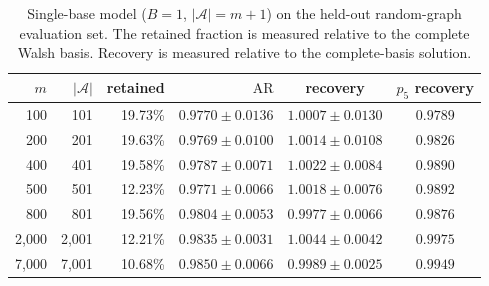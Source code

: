 \begin{table}[!h]
\centering
\caption{Single-base model ($B=1$, $\lvert\mathcal{A}\rvert=m+1$) on the held-out random-graph evaluation set. The retained fraction is measured relative to the complete Walsh basis. Recovery is measured relative to the complete-basis solution.}
\label{tab:base_mask_b1}
\begin{tabular}{rrrrcc}
\toprule
$m$ & $\lvert\mathcal{A}\rvert$ & retained & $\mathrm{AR}$ & recovery & $p_5$ recovery \\
\midrule
100 & 101 & 19.73\% & $0.9770 \pm 0.0136$ & $1.0007 \pm 0.0130$ & $0.9789$ \\
200 & 201 & 19.63\% & $0.9769 \pm 0.0100$ & $1.0014 \pm 0.0108$ & $0.9826$ \\
400 & 401 & 19.58\% & $0.9787 \pm 0.0071$ & $1.0022 \pm 0.0084$ & $0.9890$ \\
500 & 501 & 12.23\% & $0.9771 \pm 0.0066$ & $1.0018 \pm 0.0076$ & $0.9892$ \\
800 & 801 & 19.56\% & $0.9804 \pm 0.0053$ & $0.9977 \pm 0.0066$ & $0.9876$ \\
2,000 & 2,001 & 12.21\% & $0.9835 \pm 0.0031$ & $1.0044 \pm 0.0042$ & $0.9975$ \\
7,000 & 7,001 & 10.68\% & $0.9850 \pm 0.0066$ & $0.9989 \pm 0.0025$ & $0.9949$ \\
\bottomrule
\end{tabular}
\end{table}
